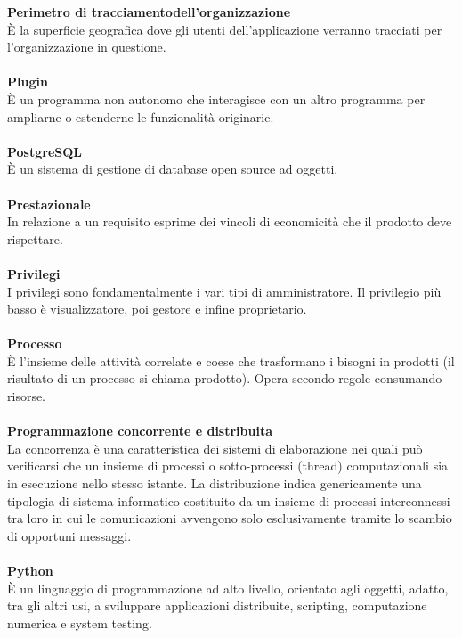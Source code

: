\textbf{Perimetro di tracciamentodell'organizzazione}\\
È la superficie geografica dove gli utenti dell'applicazione verranno tracciati per l'organizzazione in questione.\\ \\
\textbf{Plugin}\\
È un programma non autonomo che interagisce con un altro programma per ampliarne o estenderne le funzionalità originarie. \\ \\
\textbf{PostgreSQL}\\
È un sistema di gestione di database open source ad oggetti. \\ \\
\textbf{Prestazionale}\\
In relazione a un requisito esprime dei vincoli di economicità che il prodotto deve rispettare.\\ \\
\textbf{Privilegi}\\
I privilegi sono fondamentalmente i vari tipi di amministratore. Il privilegio più basso è visualizzatore, poi gestore e infine proprietario. \\ \\
\textbf{Processo}\\ 
È l'insieme delle attività correlate e coese che trasformano i bisogni in prodotti (il risultato di un processo si chiama prodotto). Opera secondo regole consumando risorse. \\ \\
\textbf{Programmazione concorrente e distribuita}\\
La concorrenza è una caratteristica dei sistemi di elaborazione nei quali può verificarsi che un insieme di processi o sotto-processi (thread) computazionali sia in esecuzione nello stesso istante. La distribuzione indica genericamente una tipologia di sistema informatico costituito da un insieme di processi interconnessi tra loro in cui le comunicazioni avvengono solo esclusivamente tramite lo scambio di opportuni messaggi. \\ \\
\textbf{Python}\\
È un linguaggio di programmazione ad alto livello, orientato agli oggetti, adatto, tra gli altri usi, a sviluppare applicazioni distribuite, scripting, computazione numerica e system testing. \\ \\
\clearpage